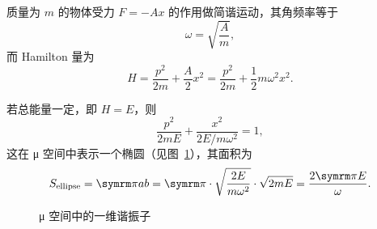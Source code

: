 \begin{example}[一维谐振子]
  质量为 $m$ 的物体受力 $F=-Ax$ 的作用做简谐运动，其角频率等于
  \begin{equation}
    \omega = \sqrt{\frac{A}{m}},
  \end{equation}
  而 Hamilton 量为
  \begin{equation}
    H = \frac{p^2}{2m} + \frac{A}{2} x^2
      = \frac{p^2}{2m} + \frac{1}{2} m \omega^2 x^2.
  \end{equation}

  若总能量一定，即 $H=E$，则
  \begin{equation}
    \frac{p^2}{2mE} + \frac{x^2}{2E / m \omega^2} = 1,
  \end{equation}
  这在 μ 空间中表示一个椭圆（见图~\ref{fig:harmonic-oscillator-mu-space}），其面积为
  \begin{equation} \label{eq:ellipse-of-harmonic-oscillator-mu-space}
    S_\text{ellipse} = \pp ab
      = \pp \cdot \sqrt{\frac{2E}{m \omega^2}} \cdot \sqrt{2mE}
      = \frac{2 \pp E}{\omega}.
  \end{equation}
\end{example}

\begin{figure}[ht]
  \centering
  \FIGPLACEHOLDER
  \caption{μ 空间中的一维谐振子}
  \label{fig:harmonic-oscillator-mu-space}
\end{figure}

